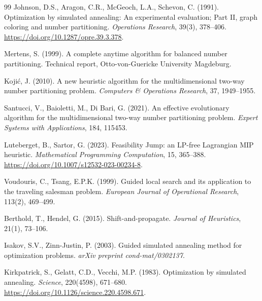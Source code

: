 \documentclass[11pt]{article}
\begin{document}
\begin{thebibliography}{99}
Johnson, D.S., Aragon, C.R., McGeoch, L.A., Schevon, C. (1991).
Optimization by simulated annealing: An experimental evaluation; Part II, graph coloring and number partitioning.
\emph{Operations Research}, 39(3), 378--406.
\url{https://doi.org/10.1287/opre.39.3.378}.

Mertens, S. (1999).
A complete anytime algorithm for balanced number partitioning.
Technical report, Otto-von-Guericke University Magdeburg.

Koji\'c, J. (2010).
A new heuristic algorithm for the multidimensional two-way number partitioning problem.
\emph{Computers \& Operations Research}, 37, 1949--1955.

Santucci, V., Baioletti, M., Di Bari, G. (2021).
An effective evolutionary algorithm for the multidimensional two-way number partitioning problem.
\emph{Expert Systems with Applications}, 184, 115453.

Luteberget, B., Sartor, G. (2023).
Feasibility Jump: an LP-free Lagrangian MIP heuristic.
\emph{Mathematical Programming Computation}, 15, 365--388.
\url{https://doi.org/10.1007/s12532-023-00234-8}.

Voudouris, C., Tsang, E.P.K. (1999).
Guided local search and its application to the traveling salesman problem.
\emph{European Journal of Operational Research}, 113(2), 469--499.

Berthold, T., Hendel, G. (2015).
Shift-and-propagate.
\emph{Journal of Heuristics}, 21(1), 73--106.

Isakov, S.V., Zinn-Justin, P. (2003).
Guided simulated annealing method for optimization problems.
\emph{arXiv preprint cond-mat/0302137}.

Kirkpatrick, S., Gelatt, C.D., Vecchi, M.P. (1983).
Optimization by simulated annealing.
\emph{Science}, 220(4598), 671--680.
\url{https://doi.org/10.1126/science.220.4598.671}.

\end{thebibliography}
\end{document}

